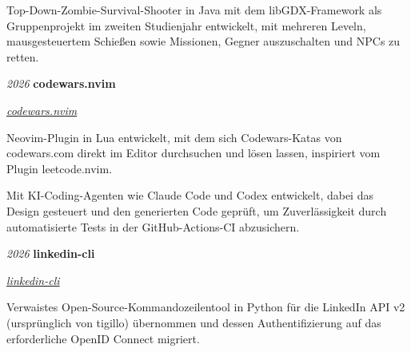 \documentclass[german]{cv}
\begin{document}
        \vspace{0.10 cm}
        \begin{onecolentry}
            \begin{highlights}
                \item Top-Down-Zombie-Survival-Shooter in Java mit dem libGDX-Framework als Gruppenprojekt im zweiten Studienjahr entwickelt, mit mehreren Leveln, mausgesteuertem Schießen sowie Missionen, Gegner auszuschalten und NPCs zu retten.
            \end{highlights}
        \end{onecolentry}

        \vspace{0.13 cm}

        \begin{twocolentry}{
        \textit{2026}}
            \textbf{codewars.nvim}

            \textit{\href{https://github.com/prosk-sudo/codewars.nvim}{codewars.nvim}}
        \end{twocolentry}

        \vspace{0.10 cm}
        \begin{onecolentry}
            \begin{highlights}
                \item Neovim-Plugin in Lua entwickelt, mit dem sich Codewars-Katas von codewars.com direkt im Editor durchsuchen und lösen lassen, inspiriert vom Plugin leetcode.nvim.
                \item Mit KI-Coding-Agenten wie Claude Code und Codex entwickelt, dabei das Design gesteuert und den generierten Code geprüft, um Zuverlässigkeit durch automatisierte Tests in der GitHub-Actions-CI abzusichern.
            \end{highlights}
        \end{onecolentry}

        \vspace{0.13 cm}

        \begin{twocolentry}{
        \textit{2026}}
            \textbf{linkedin-cli}

            \textit{\href{https://github.com/prosk-sudo/linkedin-cli}{linkedin-cli}}
        \end{twocolentry}

        \vspace{0.10 cm}
        \begin{onecolentry}
            \begin{highlights}
                \item Verwaistes Open-Source-Kommandozeilentool in Python für die LinkedIn API v2 (ursprünglich von tigillo) übernommen und dessen Authentifizierung auf das erforderliche OpenID Connect migriert.
            \end{highlights}
        \end{onecolentry}
\end{document}
